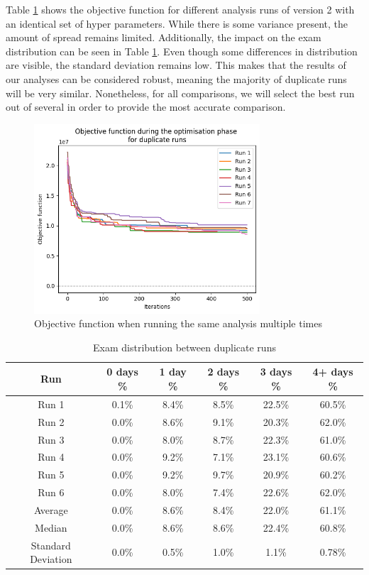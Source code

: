 Table \ref{fig:multiple_runs} shows the objective function for different analysis runs of version 2 with an identical set of hyper parameters. While there is some variance present, the amount of spread remains limited. Additionally, the impact on the exam distribution can be seen in Table \ref{tab:multiple_runs}. Even though some differences in distribution are visible, the standard deviation remains low. This makes that the results of our analyses can be considered robust, meaning the majority of duplicate runs will be very similar. Nonetheless, for all comparisons, we will select the best run out of several in order to provide the most accurate comparison.

\begin{figure}[H]
	\centering
	\includegraphics[width=0.75\textwidth]{images/initial/multiple_runs.png} 
	\caption{Objective function when running the same analysis multiple times}
	\label{fig:multiple_runs}
\end{figure}

\begin{table}[h]
	\caption{Exam distribution between duplicate runs}
	\label{tab:multiple_runs}
	\centering
	\begin{tabular}{c c c c c c}
		\hline
  	\textbf{Run}	&
   \textbf{0 days \% } &
    \textbf{1 day \% } & 
    \textbf{2 days \% } &
    \textbf{3 days \% } & 
    \textbf{4+ days \%}\\ \hline
    Run 1 & 0.1\% & 8.4\% & 8.5\% & 22.5\% & 60.5\% \\
    Run 2 & 0.0\% & 8.6\% & 9.1\% & 20.3\% & 62.0\% \\
    Run 3 & 0.0\% & 8.0\% & 8.7\% & 22.3\% & 61.0\% \\
    Run 4 & 0.0\% & 9.2\% & 7.1\% & 23.1\% & 60.6\% \\
    Run 5& 0.0\% & 9.2\% & 9.7\% & 20.9\% & 60.2\% \\
    Run 6 & 0.0\% & 8.0\% & 7.4\% & 22.6\% & 62.0\% \\ \hline
    
    Average& 0.0\% & 8.6\% & 8.4\% & 22.0\% & 61.1\%\\
    Median & 0.0\% & 8.6\% & 8.6\% & 22.4\% & 60.8\% \\\hline
    
    Standard Deviation & 0.0\% & 0.5\% & 1.0\% & 1.1\% & 0.78\%\\
        \hline
	\end{tabular}
\end{table}

